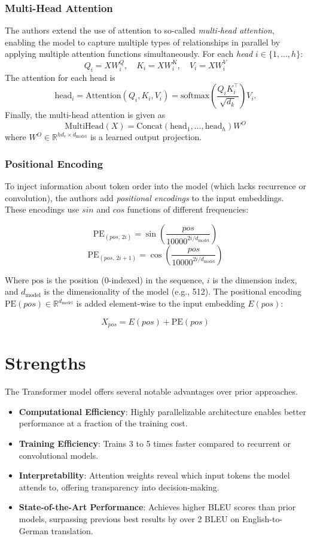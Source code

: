 \documentclass[10pt]{article}
\begin{document}
\subsubsection*{Multi-Head Attention}
The authors extend the use of attention to so-called \textit{multi-head attention}, enabling the model to capture multiple types of relationships in parallel by applying multiple attention functions simultaneously. For each \textit{head} $i \in \{1, \dots, h\}$:
\[
    Q_i = X W_i^Q,\quad K_i = X W_i^K,\quad V_i = X W_i^V
\]
The attention for each head is
\[
    \text{head}_i = \text{Attention}(Q_i, K_i, V_i) = \text{softmax}\left( \frac{Q_i K_i^\top}{\sqrt{d_k}} \right) V_i.
\]
Finally, the multi-head attention is given as
\[
    \text{MultiHead}(X) = \text{Concat}(\text{head}_1, \dots, \text{head}_h) W^O
\]
where $W^O \in \mathbb{R}^{hd_v \times d_{\text{model}}}$ is a learned output projection.


\subsubsection*{Positional Encoding}
To inject information about token order into the model (which lacks recurrence or convolution), the authors add \textit{positional encodings} to the input embeddings. These encodings use \(sin\) and \(cos\) functions of different frequencies:

\[
    \text{PE}_{(pos,\,2i)} = \sin\left(\frac{pos}{10000^{2i / d_{\text{model}}}} \right)
\]
\[
    \text{PE}_{(pos,\,2i+1)} = \cos\left(\frac{pos}{10000^{2i / d_{\text{model}}}} \right)
\]

Where \(\text{pos}\) is the position (0-indexed) in the sequence, \(i\) is the dimension index, and \(d_{\text{model}}\) is the dimensionality of the model (e.g., 512).
The positional encoding $\text{PE}(pos) \in \mathbb{R}^{d_{\text{model}}}$ is added element-wise to the input embedding $E(pos)$:

\[
    X_{pos} = E(pos) + \text{PE}(pos)
\]

\section*{Strengths}
The Transformer model offers several notable advantages over prior approaches.
\begin{itemize}
    \item \textbf{Computational Efficiency}: Highly parallelizable architecture enables better performance at a fraction of the training cost.
    \item \textbf{Training Efficiency}: Trains 3 to 5 times faster compared to recurrent or convolutional models.
    \item \textbf{Interpretability}: Attention weights reveal which input tokens the model attends to, offering transparency into decision-making.
    \item \textbf{State-of-the-Art Performance}: Achieves higher BLEU scores than prior models, surpassing previous best results by over 2 BLEU on English-to-German translation.
\end{itemize}
\end{document}
